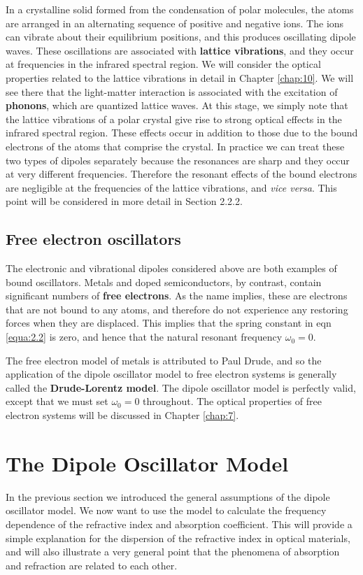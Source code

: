 \documentclass[12pt]{book}
\begin{document}
In a crystalline solid formed from the condensation of polar molecules, the atoms are arranged in an alternating sequence of positive and negative ions. The ions can vibrate about their equilibrium positions, and this produces oscillating dipole waves. These oscillations are associated with \textbf{lattice vibrations}, and they occur at frequencies in the infrared spectral region. We will consider the optical properties related to the lattice vibrations in detail in Chapter \ref{chap:10}. We will see there that the light-matter interaction is associated with the excitation of \textbf{phonons}, which are quantized lattice waves. At this stage, we simply note that the lattice vibrations of a polar crystal give rise to strong optical effects in the infrared spectral region. These effects occur in addition to those due to the bound electrons of the atoms that comprise the crystal. In practice we can treat these two types of dipoles separately because the resonances are sharp and they occur at very different frequencies. Therefore the resonant effects of the bound electrons are negligible at the frequencies of the lattice vibrations, and \textit{vice versa}. This point will be considered in more detail in Section 2.2.2.

\subsection{Free electron oscillators}
The electronic and vibrational dipoles considered above are both examples of bound oscillators. Metals and doped semiconductors, by contrast, contain significant numbers of \textbf{free electrons}. As the name implies, these are electrons that are not bound to any atoms, and therefore do not experience any restoring forces when they are displaced. This implies that the spring constant in eqn \ref{equa:2.2} is zero, and hence that the natural resonant frequency $\omega_0= 0$.

The free electron model of metals is attributed to Paul Drude, and so the application of the dipole oscillator model to free electron systems is generally called the \textbf{Drude-Lorentz model}. The dipole oscillator model is perfectly valid, except that we must set $\omega_0=0$ throughout. The optical properties of free electron systems will be discussed in Chapter \ref{chap:7}.

\section{The Dipole Oscillator Model}
In the previous section we introduced the general assumptions of the dipole oscillator model. We now want to use the model to calculate the frequency dependence of the refractive index and absorption coefficient. This will provide a simple explanation for the dispersion of the refractive index in optical materials, and will also illustrate a very general point that the phenomena of absorption and refraction are related to each other.
\end{document}
